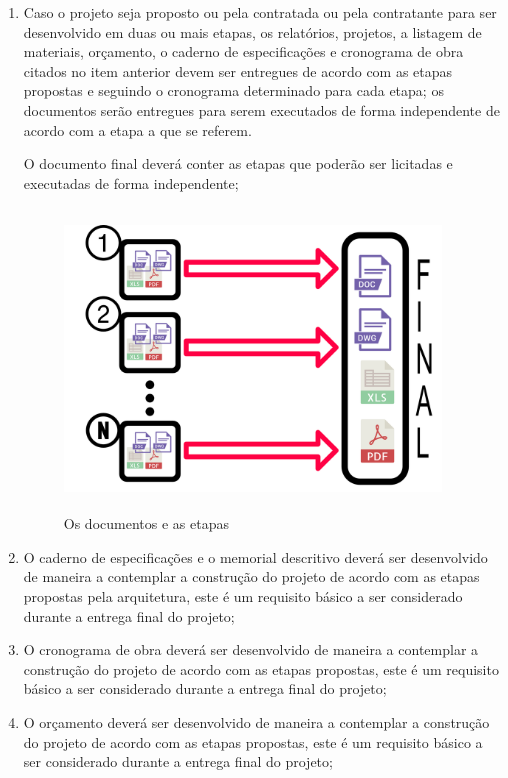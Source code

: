 \begin{enumerate}
	\item Caso o projeto seja proposto ou pela contratada ou pela contratante para ser desenvolvido em duas ou mais etapas, os relatórios, projetos, a listagem de materiais, orçamento, o caderno de especificações e cronograma de obra citados no item anterior devem ser entregues de acordo com as etapas propostas e seguindo o cronograma determinado para cada etapa; os documentos serão entregues para serem executados de forma independente de acordo com a etapa a que se referem.
	
	O documento final deverá conter as etapas que poderão ser licitadas e executadas de forma independente;

	\begin{figure}[H]
		\centering
		\includegraphics[width=10cm,height=8cm,keepaspectratio]{Figures/2. General Settings/etapas_docs.png}
		\hfill
		\caption{Os documentos e as etapas }
		\label{fig: divisao_etapas}
	\end{figure}
	
	\item O caderno de especificações e o memorial descritivo deverá ser desenvolvido de maneira a contemplar a construção do projeto de acordo com as etapas propostas pela arquitetura, este é um requisito básico a ser considerado durante a entrega final do projeto;
	
	\item O cronograma de obra deverá ser desenvolvido de maneira a contemplar a construção do projeto de acordo com as etapas propostas, este é um requisito básico a ser considerado durante a entrega final do projeto;
	
	\item O orçamento deverá ser desenvolvido de maneira a contemplar a construção do projeto de acordo com as etapas propostas, este é um requisito básico a ser considerado durante a entrega final do projeto;
	

\end{enumerate}
